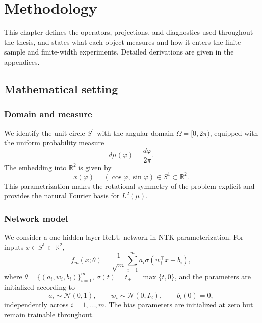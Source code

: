 \chapter{Methodology}\label{cha:methodology}

This chapter defines the operators, projections, and diagnostics used throughout
the thesis, and states what each object measures and how it enters the
finite-sample and finite-width experiments. Detailed derivations are given in the
appendices.

\section{Mathematical setting}

\subsection{Domain and measure}

We identify the unit circle \(S^1\) with the angular domain \(\Omega=[0,2\pi)\), equipped
with the uniform probability measure
\begin{equation}
	d\mu(\varphi)=\frac{d\varphi}{2\pi}.
	\label{eq:method-uniform-measure}
\end{equation}
The embedding into \(\mathbb R^2\) is given by
\begin{equation}
	x(\varphi)=(\cos\varphi,\sin\varphi)\in S^1\subset\mathbb R^2.
	\label{eq:method-circle-embedding}
\end{equation}
This parametrization makes the rotational symmetry of the problem explicit and provides the
natural Fourier basis for \(L^2(\mu)\).

\subsection{Network model}

We consider a one-hidden-layer ReLU network in NTK parameterization. For inputs
\(x\in S^1\subset\mathbb{R}^2\),
\begin{equation}
	f_m(x;\theta)=\frac{1}{\sqrt m}\sum_{i=1}^m a_i \sigma(w_i^\top x+b_i),
	\label{eq:method-network-model}
\end{equation}
where \(\theta=\{(a_i,w_i,b_i)\}_{i=1}^m\), \(\sigma(t)=t_+=\max\{t,0\}\), and the parameters are
initialized according to
\begin{equation}
	a_i \sim \mathcal{N}(0,1),
	\qquad
	w_i \sim \mathcal{N}(0,I_2),
	\qquad
	b_i(0)=0,
	\label{eq:method-network-initialization}
\end{equation}
independently across \(i=1,\dots,m\). The bias parameters are initialized at zero but remain
trainable throughout.


